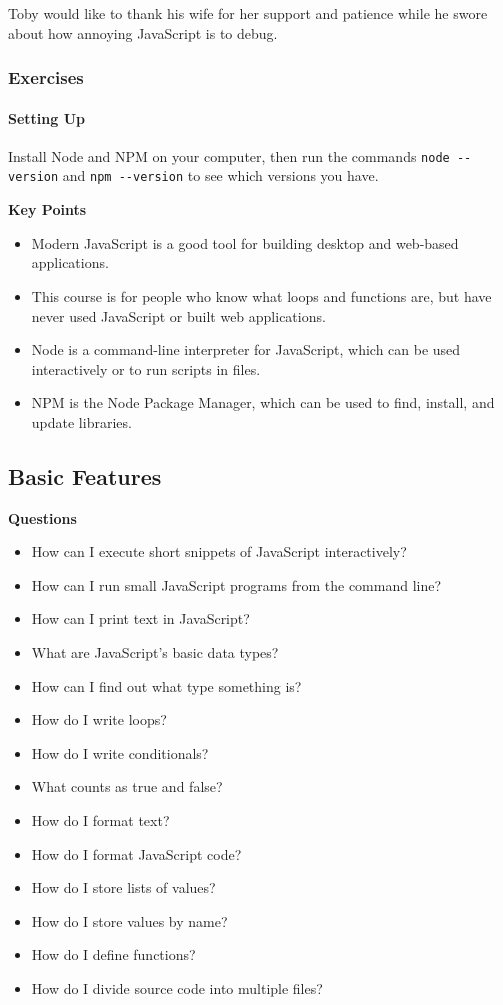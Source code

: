 Toby would like to thank his wife for her support and patience while he
swore about how annoying JavaScript is to debug.

\subsubsection{Exercises}\label{s:intro-exercises}

\paragraph{Setting Up}\label{setting-up}

Install Node and NPM on your computer, then run the commands
\texttt{node\ -\/-version} and \texttt{npm\ -\/-version} to see which
versions you have.

\textbf{Key Points}

\begin{itemize}
\tightlist
\item
  Modern JavaScript is a good tool for building desktop and web-based
  applications.
\item
  This course is for people who know what loops and functions are, but
  have never used JavaScript or built web applications.
\item
  Node is a command-line interpreter for JavaScript, which can be used
  interactively or to run scripts in files.
\item
  NPM is the Node Package Manager, which can be used to find, install,
  and update libraries.
\end{itemize}

\hypertarget{s:basics}{\subsection{Basic Features}\label{s:basics}}

\textbf{Questions}

\begin{itemize}
\tightlist
\item
  How can I execute short snippets of JavaScript interactively?
\item
  How can I run small JavaScript programs from the command line?
\item
  How can I print text in JavaScript?
\item
  What are JavaScript's basic data types?
\item
  How can I find out what type something is?
\item
  How do I write loops?
\item
  How do I write conditionals?
\item
  What counts as true and false?
\item
  How do I format text?
\item
  How do I format JavaScript code?
\item
  How do I store lists of values?
\item
  How do I store values by name?
\item
  How do I define functions?
\item
  How do I divide source code into multiple files?
\end{itemize}

